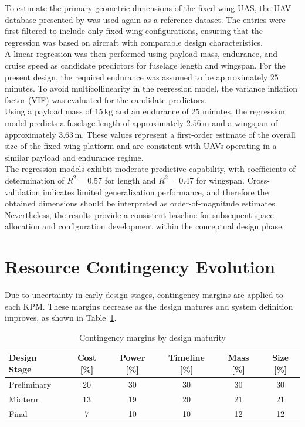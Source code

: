 To estimate the primary geometric dimensions of the fixed-wing UAS, the UAV database presented by \cite{Hann2020UAVDatabase} was used again as a reference dataset. The entries were first filtered to include only fixed-wing configurations, ensuring that the regression was based on aircraft with comparable design characteristics.
\\

A linear regression was then performed using payload mass, endurance, and cruise speed as candidate predictors for fuselage length and wingspan. For the present design, the required endurance was assumed to be approximately $25$ minutes. To avoid multicollinearity in the regression model, the variance inflation factor (VIF) was evaluated for the candidate predictors. 
\\

Using a payload mass of $15\,\mathrm{kg}$ and an endurance of $25$ minutes, the regression model predicts a fuselage length of approximately $2.56\,\mathrm{m}$ and a wingspan of approximately $3.63\,\mathrm{m}$. These values represent a first-order estimate of the overall size of the fixed-wing platform and are consistent with UAVs operating in a similar payload and endurance regime.
\\

The regression models exhibit moderate predictive capability, with coefficients of determination of $R^2 = 0.57$ for length and $R^2 = 0.47$ for wingspan. Cross-validation indicates limited generalization performance, and therefore the obtained dimensions should be interpreted as order-of-magnitude estimates. Nevertheless, the results provide a consistent baseline for subsequent space allocation and configuration development within the conceptual design phase.






\vspace{-15pt}
\section{Resource Contingency Evolution}

Due to uncertainty in early design stages, contingency margins are applied to each KPM. These margins decrease as the design matures and system definition improves, as shown in Table~\ref{tab:contingency}.

\begin{table}[h]
\centering
\caption{Contingency margins by design maturity}
\vspace{-5pt}
\label{tab:contingency}
\begin{tabular}{lccccc}
\toprule
Design Stage & Cost [\%] & Power [\%] & Timeline [\%] & Mass [\%] & Size [\%] \\
\midrule
Preliminary & 20 & 30 & 30 & 30 & 30 \\
Midterm & 13 & 19 & 20 & 21 & 21 \\
Final & 7 & 10 & 10 & 12 & 12 \\
\bottomrule
\end{tabular}
\end{table}

